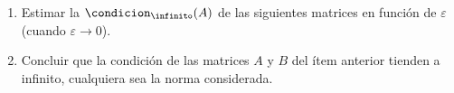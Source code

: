 \begin{enunciado}{\ejercicio}
  \begin{enumerate}[label=(\alph*)]
    \item Estimar la $\condicion_\infinito(A)$ de las siguientes matrices en función de $\varepsilon$ (cuando $\varepsilon \to 0$).
          \begin{enumerate}[label=\roman*)]
          \end{enumerate}

    \item Concluir que la condición de las matrices $A$ y $B$ del ítem anterior tienden a infinito, cualquiera
          sea la norma considerada.
  \end{enumerate}
\end{enunciado}

